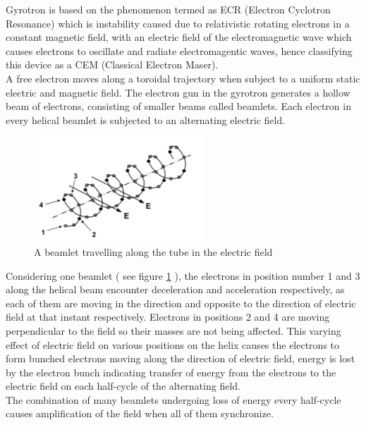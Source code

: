 Gyrotron is based on the phenomenon termed as ECR (Electron Cyclotron Resonance) which is instability caused due to relativistic rotating electrons in a constant magnetic field, with an electric field of the electromagnetic wave which causes electrons to oscillate and radiate electromagentic waves, hence classifying this device as a CEM (Classical Electron Maser).\\

A free electron moves along a toroidal trajectory when subject to a uniform static electric and magnetic field. The electron gun in the gyrotron generates a hollow beam of electrons, consisting of smaller beams called beamlets. Each electron in every helical beamlet is subjected to an alternating electric field.\\

\begin{figure}[H]
\centering
\includegraphics{images/beamlet}
\caption{A beamlet travelling along the tube in the electric field}
\label{fig:beamlet}
\end{figure}

Considering one beamlet ( see figure \ref{fig:beamlet} ), the electrons in position number 1 and 3 along the helical beam encounter deceleration and acceleration respectively, as each of them are moving in the direction and opposite to the direction of  electric field at that instant respectively. Electrons in positions 2 and 4 are moving perpendicular to the field so their masses are not being affected. This varying effect of electric field on various positions on the helix causes the electrons to form bunched electrons moving along the direction of electric field, energy is lost by the electron bunch indicating transfer of energy from the electrons to the electric field on each half-cycle of the alternating field.\\

The combination of many beamlets undergoing loss of energy every half-cycle causes amplification of the field when all of them synchronize.